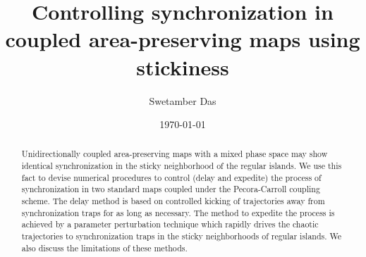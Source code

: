 \documentclass[reprint,amsmath,amssymb,aps,pre]{revtex4-1}
\begin{document}
\title{Controlling synchronization in coupled area-preserving maps using 
stickiness}

\author{Swetamber Das}

\date{\today}

\begin{abstract}
Unidirectionally coupled area-preserving maps with a mixed phase space may 
show identical synchronization in the sticky neighborhood of the regular 
islands. We use this fact to devise numerical procedures to 
control (delay and expedite) the process of synchronization in two standard maps coupled under  the Pecora-Carroll coupling scheme. The delay method is based on controlled kicking of trajectories away from synchronization traps for as long as necessary. The method to expedite the process is achieved by a parameter perturbation technique which rapidly drives the chaotic trajectories to synchronization traps in the sticky neighborhoods 
of regular islands. We also discuss the limitations of these methods.
\end{abstract}


\maketitle
\end{document}
